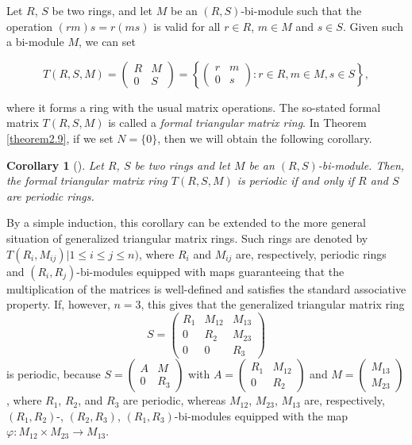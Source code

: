 \documentclass[12pt]{amsart}
\newtheorem{cor}[thm]{Corollary}
\theoremstyle{definition}
\theoremstyle{remark}
\numberwithin{equation}{section}
\begin{document}
Let $R$, $S$ be two rings, and let $M$ be an $(R,S)$-bi-module such that the operation $(rm)s=r(ms)$ is valid for all $r\in R$, $m\in M$ and $s\in S$. Given such a bi-module $M$, we can set

\[T(R,S,M)=\begin{pmatrix}
R & M \\
0 & S
\end{pmatrix}=\left\{ \begin{pmatrix}
                        r & m \\
                        0 & s
                       \end{pmatrix} : r \in R, m \in M, s \in S  \right\},
\]

\noindent where it forms a ring with the usual matrix operations. The so-stated formal matrix $T(R,S,M)$ is called a {\it formal triangular matrix ring}. In Theorem \ref{theorem2.9}, if we set $N=\{0\}$, then we will obtain the following corollary.

\begin{cor}[{\cite[Theorem 2.13]{BCL}}]
Let $R$, $S$ be two rings and let $M$ be an $(R,S)$-bi-module. Then, the formal triangular matrix ring $T(R,S,M)$ is periodic if and only if $R$ and $S$ are periodic rings.
\end{cor}

By a simple induction, this corollary can be extended to the more general situation of generalized triangular matrix rings. Such rings are denoted by $T(R_i,M_{ij})| 1 \leq i \leq j \leq n)$, where $R_i$ and $M_{ij}$ are, respectively, periodic rings and $(R_i,R_j)$-bi-modules equipped with maps guaranteeing that the multiplication of the matrices is well-defined and satisfies the standard associative property. If, however, $n=3$, this gives that the generalized triangular matrix ring
$$S=\begin{pmatrix}
R_1 & M_{12} & M_{13} \\
0   & R_2    & M_{23} \\
0   & 0      & R_3
\end{pmatrix}$$
is periodic, because
$S=\begin{pmatrix}
A & M \\
0 & R_3
\end{pmatrix}$ with
$A=\begin{pmatrix}
R_1 & M_{12} \\
0 & R_2
\end{pmatrix}$ and
$M=\begin{pmatrix}
M_{13} \\
M_{23}
\end{pmatrix}$, where $R_1$, $R_2$, and $R_3$ are periodic, whereas $M_{12}$, $M_{23}$, $M_{13}$ are, respectively, $(R_1,R_2)$-, $(R_2,R_3)$, $(R_1,R_3)$-bi-modules equipped with the map $\varphi: M_{12} \times M_{23} \rightarrow M_{13}$.
\end{document}
